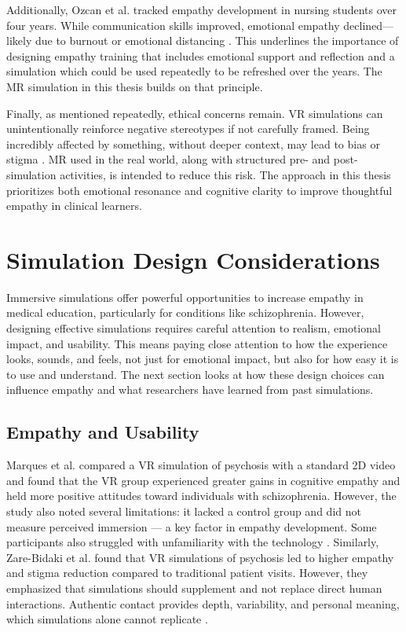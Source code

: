 Additionally, Ozcan et al. tracked empathy development in nursing students over four years. While communication skills improved, emotional empathy declined—likely due to burnout or emotional distancing \cite{Ozcan2018}. This underlines the importance of designing empathy training that includes emotional support and reflection and a simulation which could be used repeatedly to be refreshed over the years. The MR simulation in this thesis builds on that principle.

\vspace{1em}

Finally, as mentioned repeatedly, ethical concerns remain. VR simulations can unintentionally reinforce negative stereotypes if not carefully framed. Being incredibly affected by something, without deeper context, may lead to bias or stigma \cite{Rueda2020}. MR used in the real world, along with structured pre- and post-simulation activities, is intended to reduce this risk. The approach in this thesis prioritizes both emotional resonance and cognitive clarity to improve thoughtful empathy in clinical learners.


\section{Simulation Design Considerations}

Immersive simulations offer powerful opportunities to increase empathy in medical education, particularly for conditions like schizophrenia. However, designing effective simulations requires careful attention to realism, emotional impact, and usability. This means paying close attention to how the experience looks, sounds, and feels, not just for emotional impact, but also for how easy it is to use and understand. The next section looks at how these design choices can influence empathy and what researchers have learned from past simulations.

\subsection{Empathy and Usability}

Marques et al. compared a VR simulation of psychosis with a standard 2D video and found that the VR group experienced greater gains in cognitive empathy and held more positive attitudes toward individuals with schizophrenia. However, the study also noted several limitations: it lacked a control group and did not measure perceived immersion — a key factor in empathy development. Some participants also struggled with unfamiliarity with the technology \cite{Marques2022}. Similarly, Zare-Bidaki et al. found that VR simulations of psychosis led to higher empathy and stigma reduction compared to traditional patient visits. However, they emphasized that simulations should supplement and not replace direct human interactions. Authentic contact provides depth, variability, and personal meaning, which simulations alone cannot replicate \cite{Zare-Bidaki2022, Hsia2022}.

